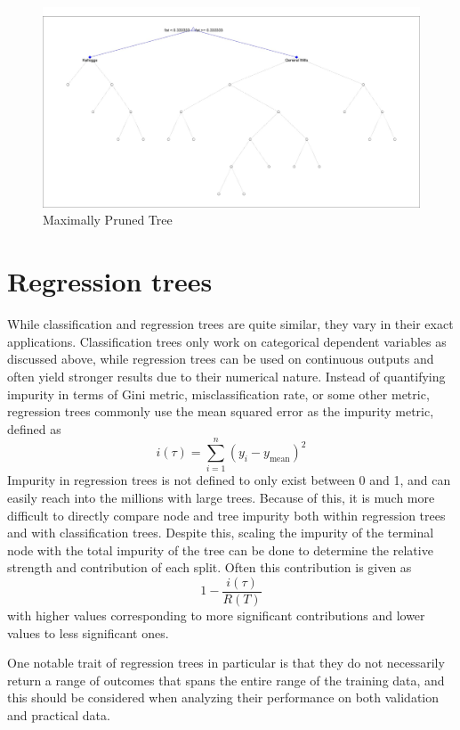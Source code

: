 \documentclass[12pt,english,letterpaper]{article}
\begin{document}
\begin{figure}[tbp!]
    \centering
    \includegraphics[width=\linewidth]{Cereal Tree Pruned 4.jpg}
    \caption{Maximally Pruned Tree}
    \label{fig:prune4}
\end{figure}

\section{Regression trees}

While classification and regression trees are quite similar, they vary in their exact applications. Classification trees only work on categorical dependent variables as discussed above, while regression trees can be used on continuous outputs and often yield stronger results due to their numerical nature. Instead of quantifying impurity in terms of Gini metric, misclassification rate, or some other metric, regression trees commonly use the mean squared error as the impurity metric, defined as
\[i(\tau)=\sum_{i=1}^n (y_i-y_{\text{mean}})^2\]
Impurity in regression trees is not defined to only exist between 0 and 1, and can easily reach into the millions with large trees. Because of this, it is much more difficult to directly compare node and tree impurity both within regression trees and with classification trees. Despite this, scaling the impurity of the terminal node with the total impurity of the tree can be done to determine the relative strength and contribution of each split. Often this contribution is given as
\[1-\frac{i(\tau)}{R(T)}\]
 with higher values corresponding to more significant contributions and lower values to less significant ones. \cite{zhang}

One notable trait of regression trees in particular is that they do not necessarily return a range of outcomes that spans the entire range of the training data, and this should be considered when analyzing their performance on both validation and practical data.
\end{document}
